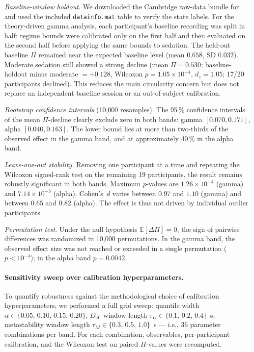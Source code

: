 ﻿\documentclass[11pt,a4paper]{article}
\theoremstyle{plain}
\theoremstyle{definition}
\theoremstyle{remark}
\begin{document}
\emph{Baseline-window holdout.} We downloaded the Cambridge raw-data bundle for \citet{chennu2016} and used the included \texttt{datainfo.mat} table to verify the state labels. For the theory-driven gamma analysis, each participant's baseline recording was split in half: regime bounds were calibrated only on the first half and then evaluated on the second half before applying the same bounds to sedation. The held-out baseline $\Pi$ remained near the expected baseline level (mean $0.658$, SD $0.032$). Moderate sedation still showed a strong decline (mean $\Pi = 0.530$; baseline-holdout minus moderate $= +0.128$, Wilcoxon $p = 1.05 \times 10^{-4}$, $d_z = 1.05$; 17/20 participants declined). This reduces the main circularity concern but does not replace an independent baseline session or an out-of-subject calibration.

\emph{Bootstrap confidence intervals} (10{,}000 resamples). The 95\,\% confidence intervals of the mean $\Pi$-decline clearly exclude zero in both bands: gamma $[0.070, 0.171]$, alpha $[0.040, 0.163]$. The lower bound lies at more than two-thirds of the observed effect in the gamma band, and at approximately 40\,\% in the alpha band.

\emph{Leave-one-out stability.} Removing one participant at a time and repeating the Wilcoxon signed-rank test on the remaining 19 participants, the result remains robustly significant in both bands. Maximum $p$-values are $1.26 \times 10^{-4}$ (gamma) and $7.14 \times 10^{-3}$ (alpha). Cohen's~$d$ varies between $0.97$ and $1.10$ (gamma) and between $0.65$ and $0.82$ (alpha). The effect is thus not driven by individual outlier participants.

\emph{Permutation test.} Under the null hypothesis $\mathbb{E}[\Delta\Pi] = 0$, the sign of pairwise differences was randomized in 10{,}000 permutations. In the gamma band, the observed effect size was not reached or exceeded in a single permutation ($p < 10^{-4}$); in the alpha band $p = 0.0042$.

\paragraph{Sensitivity sweep over calibration hyperparameters.}
To quantify robustness against the methodological choice of calibration hyperparameters, we performed a full grid sweep: quantile width $\alpha \in \{0.05,\, 0.10,\, 0.15,\, 0.20\}$, $D_{\mathrm{eff}}$ window length $\tau_D \in \{0.1,\, 0.2,\, 0.4\}$~s, metastability window length $\tau_M \in \{0.3,\, 0.5,\, 1.0\}$~s --- i.e., 36 parameter combinations per band. For each combination, observables, per-participant calibration, and the Wilcoxon test on paired $\Pi$-values were recomputed.
\end{document}
